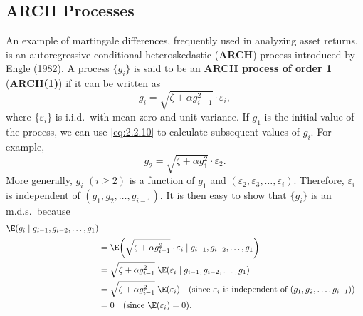 \subsection*{ARCH Processes}

An example of martingale differences, frequently used in analyzing asset returns,
is an autoregressive conditional heteroskedastic (\textbf{ARCH}) process introduced
by Engle (1982).  A process $\{g_i\}$ is said to be an \textbf{ARCH process of
order 1} (\textbf{ARCH(1)}) if it can be written as
\begin{equation}
  g_i = \sqrt{\zeta + \alpha g_{i-1}^2} \cdot \varepsilon_i,
  \label{eq:2.2.10}
\end{equation}
where $\{\varepsilon_i\}$ is i.i.d.\ with mean zero and unit variance.  If $g_1$ is
the initial value of the process, we can use \eqref{eq:2.2.10} to calculate
subsequent values of $g_i$.  For example,
\[
  g_2 = \sqrt{\zeta + \alpha g_1^2} \cdot \varepsilon_2.
\]
More generally, $g_i$ $(i \geq 2)$ is a function of $g_1$ and
$(\varepsilon_2, \varepsilon_3, \ldots, \varepsilon_i)$.  Therefore, $\varepsilon_i$
is independent of $(g_1, g_2, \ldots, g_{i-1})$.  It is then easy to show that
$\{g_i\}$ is an m.d.s.\ because
\begin{align}
  \E(g_i \mid g_{i-1}, g_{i-2}, \ldots, g_1)
  \label{eq:2.2.11} \\
  &= \E\!\left(\sqrt{\zeta + \alpha g_{i-1}^2} \cdot \varepsilon_i
     \mid g_{i-1}, g_{i-2}, \ldots, g_1\right) \notag \\
  &= \sqrt{\zeta + \alpha g_{i-1}^2}\;
     \E(\varepsilon_i \mid g_{i-1}, g_{i-2}, \ldots, g_1) \notag \\
  &= \sqrt{\zeta + \alpha g_{i-1}^2}\; \E(\varepsilon_i)
     \quad (\text{since } \varepsilon_i \text{ is independent of }
     (g_1, g_2, \ldots, g_{i-1})) \notag \\
  &= 0 \quad (\text{since } \E(\varepsilon_i) = 0).
  \label{eq:2.2.12}
\end{align}

